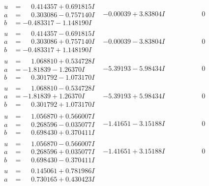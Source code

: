 \documentclass[1p]{elsarticle_modified}
\theoremstyle{definition}
\begin{document}
$$\begin{array}{c|c|c}
\begin{aligned}
u &= \phantom{-}0.414357 + 0.691815 I \\
a &= \phantom{-}0.303086 - 0.757140 I \\
b &= -0.483317 - 1.148190 I\end{aligned}
 & -0.00039 + 3.83804 I & \phantom{-0.000000 } 0 \\ \hline\begin{aligned}
u &= \phantom{-}0.414357 - 0.691815 I \\
a &= \phantom{-}0.303086 + 0.757140 I \\
b &= -0.483317 + 1.148190 I\end{aligned}
 & -0.00039 - 3.83804 I & \phantom{-0.000000 } 0 \\ \hline\begin{aligned}
u &= \phantom{-}1.068810 + 0.534728 I \\
a &= -1.81839 - 1.26370 I \\
b &= \phantom{-}0.301792 - 1.073170 I\end{aligned}
 & -5.39193 - 5.98434 I & \phantom{-0.000000 } 0 \\ \hline\begin{aligned}
u &= \phantom{-}1.068810 - 0.534728 I \\
a &= -1.81839 + 1.26370 I \\
b &= \phantom{-}0.301792 + 1.073170 I\end{aligned}
 & -5.39193 + 5.98434 I & \phantom{-0.000000 } 0 \\ \hline\begin{aligned}
u &= \phantom{-}1.056870 + 0.566007 I \\
a &= \phantom{-}0.268596 - 0.035077 I \\
b &= \phantom{-}0.698430 + 0.370411 I\end{aligned}
 & -1.41651 - 3.15188 I & \phantom{-0.000000 } 0 \\ \hline\begin{aligned}
u &= \phantom{-}1.056870 - 0.566007 I \\
a &= \phantom{-}0.268596 + 0.035077 I \\
b &= \phantom{-}0.698430 - 0.370411 I\end{aligned}
 & -1.41651 + 3.15188 I & \phantom{-0.000000 } 0 \\ \hline\begin{aligned}
u &= \phantom{-}0.145061 + 0.781986 I \\
a &= \phantom{-}0.730165 + 0.430423 I \\

\end{aligned}
\end{array}$$
\end{document}

